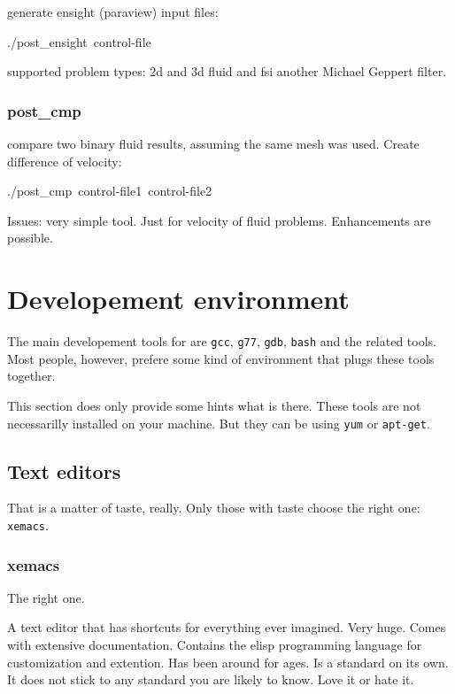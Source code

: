 generate ensight (paraview) input files:

\begin{lyxcode}
./post\_ensight~control-file
\end{lyxcode}
supported problem types: 2d and 3d fluid and fsi another Michael Geppert
filter. 


\subsubsection{post\_cmp}

compare two binary fluid results, assuming the same mesh was used.
Create difference of velocity:

\begin{lyxcode}
./post\_cmp~control-file1~control-file2
\end{lyxcode}
Issues: very simple tool. Just for velocity of fluid problems. Enhancements
are possible.


\section{Developement environment}

The main developement tools for \ccarat{} are \texttt{gcc}, \texttt{g77},
\texttt{gdb}, \texttt{bash} and the related tools. Most people, however,
prefere some kind of environment that plugs these tools together.

This section does only provide some hints what is there. These tools
are not necessarilly installed on your machine. But they can be using
\texttt{yum} or \texttt{apt-get}.


\subsection{Text editors \label{sec:Text-editors}}

That is a matter of taste, really. Only those with taste choose the
right one: \texttt{xemacs}.


\subsubsection{xemacs}

The right one. 

A text editor that has shortcuts for everything ever imagined. Very
huge. Comes with extensive documentation. Contains the elisp programming
language for customization and extention. Has been around for ages.
Is a standard on its own. It does not stick to any standard you are
likely to know. Love it or hate it.

